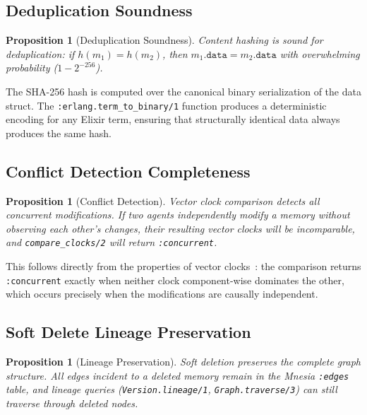 \documentclass[12pt,a4paper]{article}
\newtheorem{proposition}[theorem]{Proposition}
\theoremstyle{definition}
\begin{document}
\subsection{Deduplication Soundness}\label{subsec:dedup-soundness}

\begin{proposition}[Deduplication Soundness]\label{prop:dedup}
Content hashing is sound for deduplication: if $h(m_1) = h(m_2)$, then $m_1.\mathtt{data} = m_2.\mathtt{data}$ with overwhelming probability ($1 - 2^{-256}$).
\end{proposition}

The SHA-256 hash is computed over the canonical binary serialization of the data struct.
The \texttt{:erlang.term\_to\_binary/1} function produces a deterministic encoding for any Elixir term, ensuring that structurally identical data always produces the same hash.

\subsection{Conflict Detection Completeness}\label{subsec:conflict-completeness}

\begin{proposition}[Conflict Detection]\label{prop:conflict}
Vector clock comparison detects all concurrent modifications.
If two agents independently modify a memory without observing each other's changes, their resulting vector clocks will be incomparable, and \texttt{compare\_clocks/2} will return \texttt{:concurrent}.
\end{proposition}

This follows directly from the properties of vector clocks~\citep{fidge1988timestamps}: the comparison returns \texttt{:concurrent} exactly when neither clock component-wise dominates the other, which occurs precisely when the modifications are causally independent.

\subsection{Soft Delete Lineage Preservation}\label{subsec:lineage-preservation}

\begin{proposition}[Lineage Preservation]
Soft deletion preserves the complete graph structure.
All edges incident to a deleted memory remain in the Mnesia \texttt{:edges} table, and lineage queries (\texttt{Version.lineage/1}, \texttt{Graph.traverse/3}) can still traverse through deleted nodes.
\end{proposition}
\end{document}
